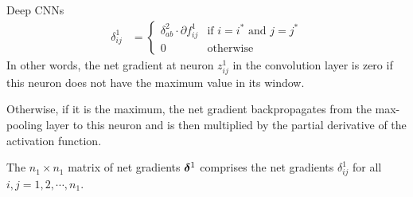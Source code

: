 \begin{frame}{Deep CNNs}
\begin{align*}
    \delta^1_{ij} & = 
    \begin{cases}
    \delta^2_{ab} \cdot \partial f^1_{ij} & \text{if $i=i^*$ and
    $j=j^*$}\\
    0 & \text{otherwise}
    \end{cases}
\end{align*}
%
%
%
In other words, the net gradient at neuron $z^1_{ij}$ in the convolution
layer is zero if this neuron does not have the maximum value 
in its window. 

\medskip

Otherwise, if it is the maximum, 
the net gradient backpropagates from the max-pooling layer to this
neuron and is then multiplied by the partial derivative of the
activation function. 


\medskip

The $n_1 \times n_1$ matrix of net
gradients ${\bm \delta}^1$ comprises the net gradients $\delta^1_{ij}$ for
all $i,j = 1,2,\cdots,n_1$.
\end{frame}
